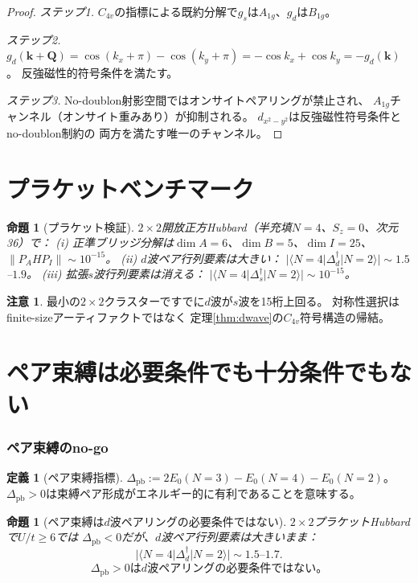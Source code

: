 \documentclass[12pt]{article}
\theoremstyle{plain}
\newtheorem{proposition}[theorem]{命題}
\theoremstyle{definition}
\newtheorem{definition}[theorem]{定義}
\newtheorem{remark}[theorem]{注意}
\numberwithin{equation}{section}
\begin{document}
\begin{proof}
\emph{ステップ1.}
$C_{4v}$の指標による既約分解で$g_s$は$A_{1g}$、$g_d$は$B_{1g}$。

\emph{ステップ2.}
$g_d(\bm{k}+\bm{Q})
=\cos(k_x+\pi)-\cos(k_y+\pi)=-\cos k_x+\cos k_y=-g_d(\bm{k})$。
反強磁性的符号条件を満たす。

\emph{ステップ3.}
No-doublon射影空間ではオンサイトペアリングが禁止され、
$A_{1g}$チャンネル（オンサイト重みあり）が抑制される。
$d_{x^2-y^2}$は反強磁性符号条件とno-doublon制約の
両方を満たす唯一のチャンネル。
\end{proof}


\part{プラケットベンチマーク}

\begin{proposition}[プラケット検証]\label{prop:plaquette}
$2\times2$開放正方Hubbard（半充填$N=4$、$S_z=0$、次元36）で：
(i) 正準ブリッジ分解は$\dim A=6$、$\dim B=5$、$\dim I=25$、
$\|P_AHP_I\|\sim10^{-15}$。
(ii) $d$波ペア行列要素は大きい：
$|\langle N\!=\!4|\Delta_d^\dagger|N\!=\!2\rangle|\sim1.5$--$1.9$。
(iii) 拡張$s$波行列要素は消える：
$|\langle N\!=\!4|\Delta_s^\dagger|N\!=\!2\rangle|\sim10^{-15}$。
\end{proposition}

\begin{remark}
最小の$2\times2$クラスターですでに$d$波が$s$波を15桁上回る。
対称性選択はfinite-sizeアーティファクトではなく
定理\ref{thm:dwave}の$C_{4v}$符号構造の帰結。
\end{remark}


\part{ペア束縛は必要条件でも十分条件でもない}

\section{ペア束縛のno-go}\label{sec:pairbinding}

\begin{definition}[ペア束縛指標]
$\Delta_{\mathrm{pb}}:=2E_0(N\!=\!3)-E_0(N\!=\!4)-E_0(N\!=\!2)$。
$\Delta_{\mathrm{pb}}>0$は束縛ペア形成がエネルギー的に有利であることを意味する。
\end{definition}

\begin{proposition}[ペア束縛は$d$波ペアリングの必要条件ではない]\label{prop:notnec}
$2\times2$プラケットHubbardで$U/t\geq 6$では
$\Delta_{\mathrm{pb}}<0$だが、$d$波ペア行列要素は大きいまま：
\[
|\langle N\!=\!4|\Delta_d^\dagger|N\!=\!2\rangle|
\sim1.5\text{--}1.7.
\]
\begin{equation}
\boxed{\Delta_{\mathrm{pb}}>0\text{は}d\text{波ペアリングの必要条件ではない。}}
\end{equation}
\end{proposition}
\end{document}
